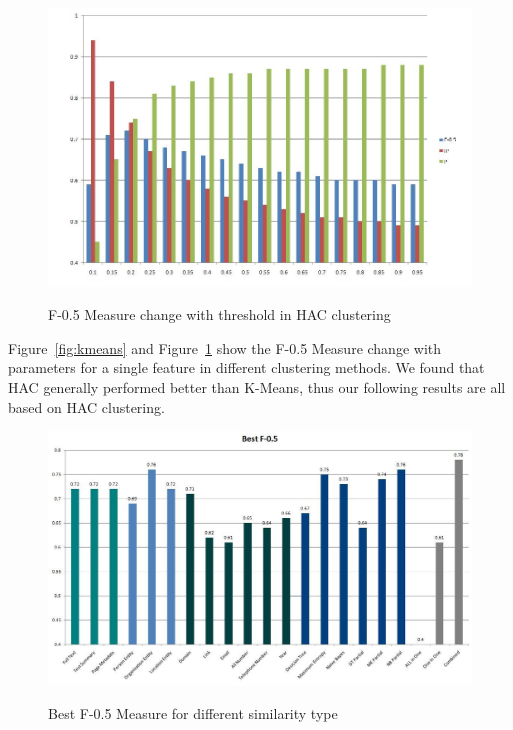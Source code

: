 \documentclass{article}
\begin{document}
\begin{CJK}{UTF8}{gbsn}
    \begin{figure}
    \caption{F-0.5 Measure change with threshold in HAC clustering}
    \includegraphics[width=120mm]{agglo}
    \label{fig:agglo}
    \end{figure}

    Figure~\ref{fig:kmeans} and Figure~\ref{fig:agglo} show the F-0.5 Measure change with parameters for a single feature in different clustering methods.
    We found that HAC generally performed better than K-Means, thus our following results are all based on HAC clustering. \\
    
    \begin{figure}
    \caption{Best F-0.5 Measure for different similarity type}
    \includegraphics[width=120mm]{best}
    \label{fig:best}
    \end{figure}


\end{CJK}
\end{document}
